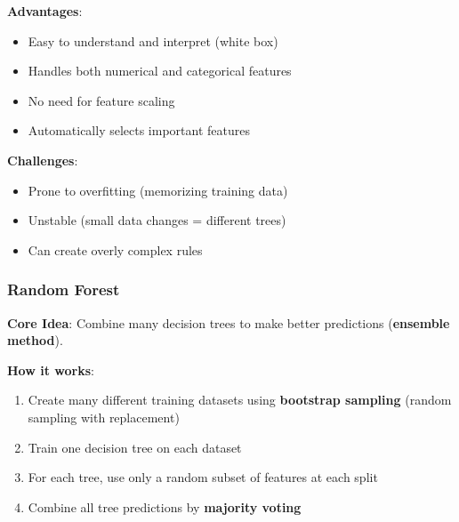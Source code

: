 \textbf{Advantages}:
\begin{itemize}
    \item Easy to understand and interpret (white box)
    \item Handles both numerical and categorical features
    \item No need for feature scaling
    \item Automatically selects important features
\end{itemize}

\textbf{Challenges}:
\begin{itemize}
    \item Prone to overfitting (memorizing training data)
    \item Unstable (small data changes = different trees)
    \item Can create overly complex rules
\end{itemize}

\subsubsection{Random Forest}
\textbf{Core Idea}: Combine many decision trees to make better predictions (\textbf{ensemble method}).

\textbf{How it works}:
\begin{enumerate}
    \item Create many different training datasets using \textbf{bootstrap sampling} (random sampling with replacement)
    \item Train one decision tree on each dataset
    \item For each tree, use only a random subset of features at each split
    \item Combine all tree predictions by \textbf{majority voting}
\end{enumerate}

